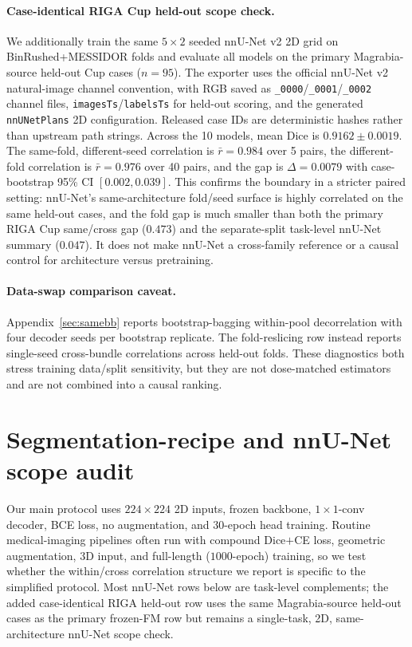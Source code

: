 \paragraph{Case-identical RIGA Cup held-out scope check.} We additionally train the same $5\times2$ seeded nnU-Net v2 2D grid on BinRushed+MESSIDOR folds and evaluate all models on the primary Magrabia-source held-out Cup cases ($n{=}95$). The exporter uses the official nnU-Net v2 natural-image channel convention, with RGB saved as \texttt{\_0000}/\texttt{\_0001}/\texttt{\_0002} channel files, \texttt{imagesTs}/\texttt{labelsTs} for held-out scoring, and the generated \texttt{nnUNetPlans} 2D configuration. Released case IDs are deterministic hashes rather than upstream path strings. Across the 10 models, mean Dice is $0.9162\pm0.0019$. The same-fold, different-seed correlation is $\bar r{=}0.984$ over 5 pairs, the different-fold correlation is $\bar r{=}0.976$ over 40 pairs, and the gap is $\Delta{=}0.0079$ with case-bootstrap 95\% CI $[0.002,0.039]$. This confirms the boundary in a stricter paired setting: nnU-Net's same-architecture fold/seed surface is highly correlated on the same held-out cases, and the fold gap is much smaller than both the primary RIGA Cup same/cross gap ($0.473$) and the separate-split task-level nnU-Net summary ($0.047$). It does not make nnU-Net a cross-family reference or a causal control for architecture versus pretraining.

\paragraph{Data-swap comparison caveat.} Appendix~\ref{sec:samebb} reports bootstrap-bagging within-pool decorrelation with four decoder seeds per bootstrap replicate. The fold-reslicing row instead reports single-seed cross-bundle correlations across held-out folds. These diagnostics both stress training data/split sensitivity, but they are not dose-matched estimators and are not combined into a causal ranking.


\section{Segmentation-recipe and nnU-Net scope audit}
\label{app:w1-scope}

Our main protocol uses $224{\times}224$ 2D inputs, frozen backbone, $1{\times}1$-conv decoder, BCE loss, no augmentation, and 30-epoch head training. Routine medical-imaging pipelines often run with compound Dice$+$CE loss, geometric augmentation, 3D input, and full-length ($1000$-epoch) training, so we test whether the within/cross correlation structure we report is specific to the simplified protocol. Most nnU-Net rows below are task-level complements; the added case-identical RIGA held-out row uses the same Magrabia-source held-out cases as the primary frozen-FM row but remains a single-task, 2D, same-architecture nnU-Net scope check.

